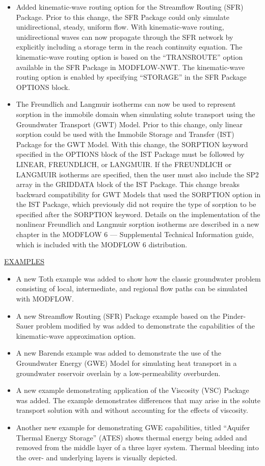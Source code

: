 \begin{itemize}
    \item Added kinematic-wave routing option for the Streamflow Routing (SFR) Package. Prior to this change, the SFR Package could only simulate unidirectional, steady, uniform flow. With kinematic-wave routing, unidirectional waves can now propagate through the SFR network by explicitly including a storage term in the reach continuity equation. The kinematic-wave routing option is based on the ``TRANSROUTE'' option available in the SFR Package in MODFLOW-NWT. The kinematic-wave routing option is enabled by specifying ``STORAGE'' in the SFR Package OPTIONS block.
    \item The Freundlich and Langmuir isotherms can now be used to represent sorption in the immobile domain when simulating solute transport using the Groundwater Transport (GWT) Model.  Prior to this change, only linear sorption could be used with the Immobile Storage and Transfer (IST) Package for the GWT Model.  With this change, the SORPTION keyword specified in the OPTIONS block of the IST Package must be followed by LINEAR, FREUNDLICH, or LANGMUIR.  If the FREUNDLICH or LANGMUIR isotherms are specified, then the user must also include the SP2 array in the GRIDDATA block of the IST Package.  This change breaks backward compatibility for GWT Models that used the SORPTION option in the IST Package, which previously did not require the type of sorption to be specified after the SORPTION keyword.  Details on the implementation of the nonlinear Freundlich and Langmuir sorption isotherms are described in a new chapter in the MODFLOW 6 --- Supplemental Technical Information guide, which is included with the MODFLOW 6 distribution.
\end{itemize}

\underline{EXAMPLES}
\begin{itemize}
    \item A new Toth example was added to show how the classic groundwater problem consisting of local, intermediate, and regional flow paths can be simulated with MODFLOW.
    \item A new Streamflow Routing (SFR) Package example based on the Pinder-Sauer problem \citep{pinder1971numerical} modified by \cite{lal2001modification} was added to demonstrate the capabilities of the kinematic-wave approximation option.
    \item A new Barends example was added to demonstrate the use of the Groundwater Energy (GWE) Model for simulating heat transport in a groundwater reservoir overlain by a low-permeability overburden.
    \item A new example demonstrating application of the Viscosity (VSC) Package was added.  The example demonstrates differences that may arise in the solute transport solution with and without accounting for the effects of viscosity.
    \item Another new example for demonstrating GWE capabilities, titled ``Aquifer Thermal Energy Storage'' (ATES) shows thermal energy being added and removed from the middle layer of a three layer system.  Thermal bleeding into the over- and underlying layers is visually depicted.  
\end{itemize}

